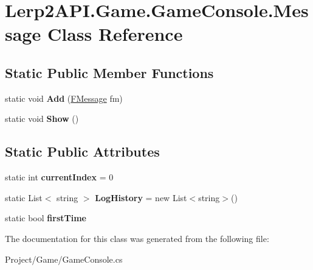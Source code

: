 \hypertarget{class_lerp2_a_p_i_1_1_game_1_1_game_console_1_1_message}{}\section{Lerp2\+A\+P\+I.\+Game.\+Game\+Console.\+Message Class Reference}
\label{class_lerp2_a_p_i_1_1_game_1_1_game_console_1_1_message}
\subsection*{Static Public Member Functions}
\begin{DoxyCompactItemize}
\item 
\mbox{\label{class_lerp2_a_p_i_1_1_game_1_1_game_console_1_1_message_a2a7b3e173df5c61ddaac7760382edabf}} 
static void {\bfseries Add} (\hyperlink{class_lerp2_a_p_i_1_1_game_1_1_game_console_1_1_f_message}{F\+Message} fm)
\item 
\mbox{\label{class_lerp2_a_p_i_1_1_game_1_1_game_console_1_1_message_af469f65ee48d9fb78b53729a0a04390a}} 
static void {\bfseries Show} ()
\end{DoxyCompactItemize}
\subsection*{Static Public Attributes}
\begin{DoxyCompactItemize}
\item 
\mbox{\label{class_lerp2_a_p_i_1_1_game_1_1_game_console_1_1_message_aacac1c5592a278341ce198dddd0ab8cb}} 
static int {\bfseries current\+Index} = 0
\item 
\mbox{\label{class_lerp2_a_p_i_1_1_game_1_1_game_console_1_1_message_acdd82e95ed96665f7f331f9ec05f045b}} 
static List$<$ string $>$ {\bfseries Log\+History} = new List$<$string$>$()
\item 
\mbox{\label{class_lerp2_a_p_i_1_1_game_1_1_game_console_1_1_message_a9602f4fb5c962a386cfc74de6449035b}} 
static bool {\bfseries first\+Time}
\end{DoxyCompactItemize}


The documentation for this class was generated from the following file\+:\begin{DoxyCompactItemize}
\item 
Project/\+Game/Game\+Console.\+cs\end{DoxyCompactItemize}
